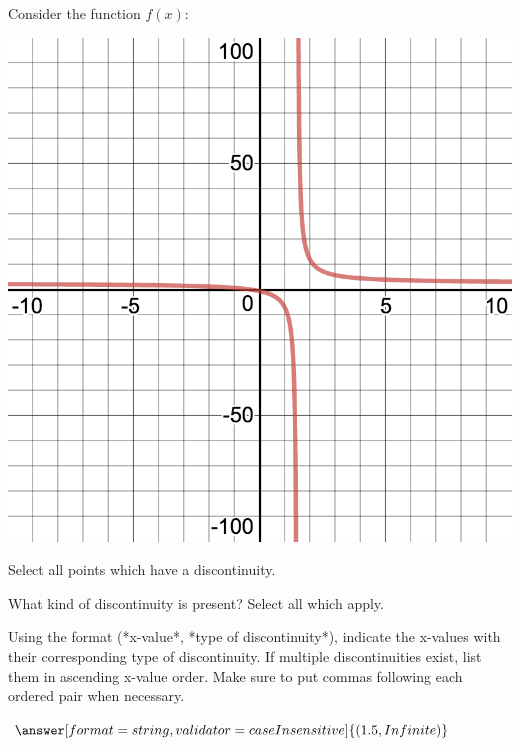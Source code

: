 \documentclass{ximera}
\begin{document}
\begin{question}
Consider the function $f(x)$:
\begin{image}
\includegraphics{continuity3}
\end{image}
Select all points which have a discontinuity.

\begin{selectAll}
\end{selectAll}

What kind of discontinuity is present? Select all which apply.

\begin{selectAll}
\end{selectAll}

Using the format (*x-value*, *type of discontinuity*), indicate the x-values with their corresponding type of discontinuity. If multiple discontinuities exist, list them in ascending x-value order. Make sure to put commas following each ordered pair when necessary.

$\answer[format=string,validator=caseInsensitive]{(1.5,Infinite)}$
\end{question}
\end{document}

